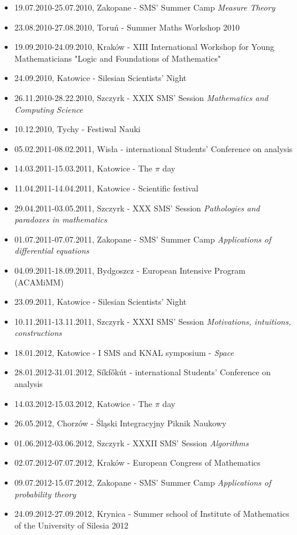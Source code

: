 \begin{itemize}
  \item 19.07.2010-25.07.2010, Zakopane -  SMS' Summer Camp \textsl{Measure Theory}
  \item 23.08.2010-27.08.2010, Toruń - Summer Maths Workshop 2010
  \item 19.09.2010-24.09.2010, Kraków - XIII International Workshop for Young Mathematicians "Logic and Foundations of Mathematics"
  \item 24.09.2010, Katowice - Silesian Scientists' Night
  \item 26.11.2010-28.22.2010, Szczyrk - XXIX SMS' Session \textsl{Mathematics and Computing Science}
  \item 10.12.2010, Tychy - Festiwal Nauki
  \item 05.02.2011-08.02.2011, Wisła -  international Students' Conference on analysis
  \item 14.03.2011-15.03.2011, Katowice - The $\pi$ day
  \item 11.04.2011-14.04.2011, Katowice - Scientific festival
  \item 29.04.2011-03.05.2011, Szczyrk - XXX SMS' Session \textsl{Pathologies and paradoxes in mathematics}
  \item 01.07.2011-07.07.2011, Zakopane -  SMS' Summer Camp \textsl{Applications of differential equations}
  \item 04.09.2011-18.09.2011, Bydgoszcz - European Intensive Program (ACAMiMM)
  \item 23.09.2011, Katowice - Silesian Scientists' Night
  \item 10.11.2011-13.11.2011, Szczyrk - XXXI SMS' Session \textsl{Motivations, intuitions, constructions}
  \item 18.01.2012, Katowice - I SMS and KNAL symposium - \textsl{Space}
  \item 28.01.2012-31.01.2012, Síkfőkút -  international Students' Conference on analysis
  \item 14.03.2012-15.03.2012, Katowice - The $\pi$ day
  \item 26.05.2012, Chorzów - Śląski Integracyjny Piknik Naukowy
  \item 01.06.2012-03.06.2012, Szczyrk - XXXII SMS' Session \textsl{Algorithms}
  \item 02.07.2012-07.07.2012, Kraków -  European Congress of Mathematics
  \item 09.07.2012-15.07.2012, Zakopane -  SMS' Summer Camp \textsl{Applications of probability theory}
  \item 24.09.2012-27.09.2012, Krynica - Summer school of Institute of Mathematics of the University of Silesia 2012

\end{itemize}
